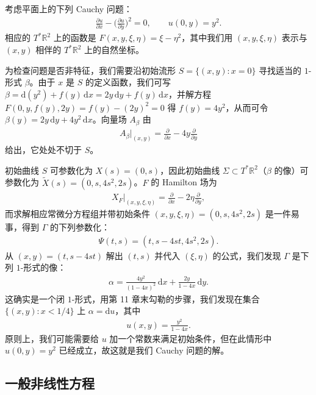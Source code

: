 \documentclass[../../main.tex]{subfiles}
\begin{document}
\begin{example}\label{example:ch22-hj-example}
考虑平面上的下列 Cauchy 问题：
\begin{align*}
\frac{\partial u}{\partial x}-\big(\tfrac{\partial u}{\partial y}\big)^2=0,\qquad u(0,y)=y^2.
\end{align*}
相应的 $T^*\mathbb{R}^2$ 上的函数是 $F(x,y,\xi,\eta)=\xi-\eta^2$，其中我们用 $(x,y,\xi,\eta)$ 表示与 $(x,y)$ 相伴的 $T^*\mathbb{R}^2$ 上的自然坐标。

为检查问题是否非特征，我们需要沿初始流形 $S=\{(x,y):x=0\}$ 寻找适当的 $1$-形式 $\beta$。由于 $x$ 是 $S$ 的定义函数，我们可写 $\beta=\mathrm{d}(y^2)+f(y)\,\mathrm{d}x=2y\,\mathrm{d}y+f(y)\,\mathrm{d}x$，并解方程 $F(0,y,f(y),2y)=f(y)-(2y)^2=0$ 得 $f(y)=4y^2$，从而可令 $\beta(y)=2y\,\mathrm{d}y+4y^2\,\mathrm{d}x$。向量场 $A_\beta$ 由
\begin{align*}
A_\beta|_{(x,y)}=\frac{\partial}{\partial x}-4y\frac{\partial}{\partial y}
\end{align*}
给出，它处处不切于 $S$。

初始曲线 $S$ 可参数化为 $X(s)=(0,s)$，因此初始曲线 $\Sigma\subset T^*\mathbb{R}^2$（$\beta$ 的像）可参数化为 $\widetilde X(s)=(0,s,4s^2,2s)$。$F$ 的 Hamilton 场为
\begin{align*}
X_F|_{(x,y,\xi,\eta)}=\frac{\partial}{\partial x}-2\eta\frac{\partial}{\partial y},
\end{align*}
而求解相应常微分方程组并带初始条件 $(x,y,\xi,\eta)=(0,s,4s^2,2s)$ 是一件易事，得到 $\Gamma$ 的下列参数化：
\begin{align*}
\Psi(t,s)=(t,s-4st,4s^2,2s).
\end{align*}
从 $(x,y)=(t,s-4st)$ 解出 $(t,s)$ 并代入 $(\xi,\eta)$ 的公式，我们发现 $\Gamma$ 是下列 $1$-形式的像：
\begin{align*}
\alpha=\frac{4y^2}{(1-4x)^2}\,\mathrm{d}x+\frac{2y}{1-4x}\,\mathrm{d}y.
\end{align*}
这确实是一个闭 $1$-形式，用第 11 章末勾勒的步骤，我们发现在集合 $\{(x,y):x<1/4\}$ 上 $\alpha=\mathrm{d}u$，其中
\begin{align*}
u(x,y)=\frac{y^2}{1-4x}.
\end{align*}
原则上，我们可能需要给 $u$ 加一个常数来满足初始条件，但在此情形中 $u(0,y)=y^2$ 已经成立，故这就是我们 Cauchy 问题的解。
\end{example}

\subsection*{一般非线性方程}
\end{document}

